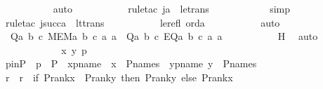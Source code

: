 \begin{isabellebody}
\ \ \ \ \ \ \ \ \ \isamarkupfalse%
\ auto\ \isanewline
\ \ \ \ \ \ \ \ \isamarkupfalse%
\ {\isacharparenleft}{\kern0pt}rule{\isacharunderscore}{\kern0pt}tac\ j{\isacharequal}{\kern0pt}a\ \ le{\isacharunderscore}{\kern0pt}trans{\isacharparenright}{\kern0pt}\ \isanewline
\ \ \ \ \ \ \ \ \ \isamarkupfalse%
\ simp\ \isanewline
\ \ \ \ \ \ \ \ \isamarkupfalse%
\ {\isacharparenleft}{\kern0pt}rule{\isacharunderscore}{\kern0pt}tac\ j{\isacharequal}{\kern0pt}{\isachardoublequoteopen}succ{\isacharparenleft}{\kern0pt}a{\isacharparenright}{\kern0pt}{\isachardoublequoteclose}\ \ lt{\isacharunderscore}{\kern0pt}trans{\isacharparenright}{\kern0pt}\ \isanewline
\ \ \ \ \ \ \ \ \isamarkupfalse%
\ le{\isacharunderscore}{\kern0pt}refl\ orda\ \isanewline
\ \ \ \ \ \ \ \ \isamarkupfalse%
\ auto\ \isanewline
\ \ \ \ \ \ \isamarkupfalse%
\ \isamarkupfalse%
\ {\isachardoublequoteopen}\ Q{\isacharparenleft}{\kern0pt}{\isasymlambda}a\ b\ c{\isachardot}{\kern0pt}\ MEM{\isacharparenleft}{\kern0pt}a{\isacharcomma}{\kern0pt}\ b{\isacharcomma}{\kern0pt}\ c{\isacharparenright}{\kern0pt}{\isacharcomma}{\kern0pt}\ a{\isacharcomma}{\kern0pt}\ a{\isacharparenright}{\kern0pt}\ {\isasymand}\ Q{\isacharparenleft}{\kern0pt}{\isasymlambda}a\ b\ c{\isachardot}{\kern0pt}\ EQ{\isacharparenleft}{\kern0pt}a{\isacharcomma}{\kern0pt}\ b{\isacharcomma}{\kern0pt}\ c{\isacharparenright}{\kern0pt}{\isacharcomma}{\kern0pt}\ a{\isacharcomma}{\kern0pt}\ a{\isacharparenright}{\kern0pt}{\isachardoublequoteclose}\ \isanewline
\ \ \ \ \ \ \ \ \isamarkupfalse%
\ H\ \isamarkupfalse%
\ auto\ \isanewline
\ \ \ \ \isamarkupfalse%
\isanewline
\ \ \ \ \ \ \isanewline
\ \ \ \ \isamarkupfalse%
\ x\ y\ p\ \isamarkupfalse%
\ pinP\ {\isacharcolon}{\kern0pt}\ {\isachardoublequoteopen}p\ {\isasymin}\ P{\isachardoublequoteclose}\ \ xpname\ {\isacharcolon}{\kern0pt}\ {\isachardoublequoteopen}x\ {\isasymin}\ P{\isacharunderscore}{\kern0pt}names{\isachardoublequoteclose}\ \ ypname{\isacharcolon}{\kern0pt}\ {\isachardoublequoteopen}y\ {\isasymin}\ P{\isacharunderscore}{\kern0pt}names{\isachardoublequoteclose}\ \isanewline
\isanewline
\ \ \ \ \isamarkupfalse%
\ r\ \ {\isachardoublequoteopen}r\ {\isasymequiv}\ if\ P{\isacharunderscore}{\kern0pt}rank{\isacharparenleft}{\kern0pt}x{\isacharparenright}{\kern0pt}\ {\isasymle}\ P{\isacharunderscore}{\kern0pt}rank{\isacharparenleft}{\kern0pt}y{\isacharparenright}{\kern0pt}\ then\ P{\isacharunderscore}{\kern0pt}rank{\isacharparenleft}{\kern0pt}y{\isacharparenright}{\kern0pt}\ else\ P{\isacharunderscore}{\kern0pt}rank{\isacharparenleft}{\kern0pt}x{\isacharparenright}{\kern0pt}{\isachardoublequoteclose}\ \isanewline

\end{isabellebody}
